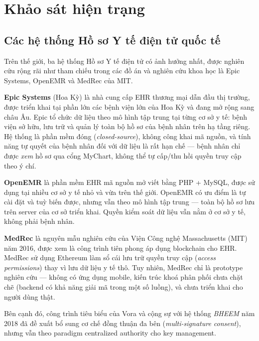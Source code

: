 \documentclass[../DoAn]{subfiles}
\begin{document}

\section{Khảo sát hiện trạng}

\subsection{Các hệ thống Hồ sơ Y tế điện tử quốc tế}

Trên thế giới, ba hệ thống Hồ sơ Y tế điện tử có ảnh hưởng nhất, được nghiên cứu rộng rãi như tham chiếu trong các đồ án và nghiên cứu khoa học là Epic Systems, OpenEMR và MedRec của MIT.

\textbf{Epic Systems} (Hoa Kỳ) là nhà cung cấp EHR thương mại dẫn đầu thị trường, được triển khai tại phần lớn các bệnh viện lớn của Hoa Kỳ và đang mở rộng sang châu Âu. Epic tổ chức dữ liệu theo mô hình tập trung tại từng cơ sở y tế: bệnh viện sở hữu, lưu trữ và quản lý toàn bộ hồ sơ của bệnh nhân trên hạ tầng riêng. Hệ thống là phần mềm đóng (\textit{closed-source}), không công khai mã nguồn, và tính năng tự quyết của bệnh nhân đối với dữ liệu là rất hạn chế --- bệnh nhân chỉ được \textit{xem} hồ sơ qua cổng MyChart, không thể tự cấp/thu hồi quyền truy cập theo ý chí.

\textbf{OpenEMR} là phần mềm EHR mã nguồn mở viết bằng PHP + MySQL, được sử dụng tại nhiều cơ sở y tế nhỏ và vừa trên thế giới. OpenEMR có ưu điểm là tự cài đặt và tuỳ biến được, nhưng vẫn theo mô hình tập trung --- toàn bộ hồ sơ lưu trên server của cơ sở triển khai. Quyền kiểm soát dữ liệu vẫn nằm ở cơ sở y tế, không phải bệnh nhân.

\textbf{MedRec} \cite{azaria2016medrec} là nguyên mẫu nghiên cứu của Viện Công nghệ Massachusetts (MIT) năm 2016, được xem là công trình tiên phong áp dụng blockchain cho EHR. MedRec sử dụng Ethereum làm sổ cái lưu trữ quyền truy cập (\textit{access permissions}) thay vì lưu dữ liệu y tế thô. Tuy nhiên, MedRec chỉ là prototype nghiên cứu --- không có ứng dụng mobile, kiến trúc khoá phân phối chưa chặt chẽ (backend có khả năng giải mã trong một số luồng), và chưa triển khai cho người dùng thật.

Bên cạnh đó, công trình tiêu biểu của Vora và cộng sự \cite{vora2018bheem} với hệ thống \textit{BHEEM} năm 2018 đã đề xuất bổ sung cơ chế đồng thuận đa bên (\textit{multi-signature consent}), nhưng vẫn theo paradigm centralized authority cho key management.
\end{document}
